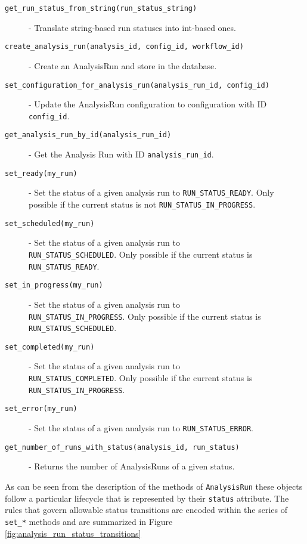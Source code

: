 \begin{description}
\item [\texttt{get_run_status_from_string(run_status_string)}] - Translate string-based run statuses into int-based ones.
\item [\texttt{create_analysis_run(analysis_id, config_id, workflow_id)}] - Create an AnalysisRun and store in the database.
\item [\texttt{set_configuration_for_analysis_run(analysis_run_id, config_id)}] - Update the AnalysisRun configuration to configuration with ID \texttt{config_id}.
\item [\texttt{get_analysis_run_by_id(analysis_run_id)}] - Get the Analysis Run with ID \texttt{analysis_run_id}.
\item [\texttt{set_ready(my_run)}] - Set the status of a given analysis run to \texttt{RUN_STATUS_READY}. Only possible if the current status is not \texttt{RUN_STATUS_IN_PROGRESS}.
\item [\texttt{set_scheduled(my_run)}] - Set the status of a given analysis run to\\ \texttt{RUN_STATUS_SCHEDULED}. Only possible if the current status is\\ \texttt{RUN_STATUS_READY}.
\item [\texttt{set_in_progress(my_run)}] - Set the status of a given analysis run to\\ \texttt{RUN_STATUS_IN_PROGRESS}. Only possible if the current status is\\ \texttt{RUN_STATUS_SCHEDULED}.
\item [\texttt{set_completed(my_run)}] - Set the status of a given analysis run to\\ \texttt{RUN_STATUS_COMPLETED}. Only possible if the current status is\\ \texttt{RUN_STATUS_IN_PROGRESS}.
\item [\texttt{set_error(my_run)}] - Set the status of a given analysis run to \texttt{RUN_STATUS_ERROR}.
\item [\texttt{get_number_of_runs_with_status(analysis_id, run_status)}] - Returns the number of AnalysisRuns of a given status.
\end{description}

As can be seen from the description of the methods of \texttt{AnalysisRun} these objects follow a particular lifecycle that is represented by their \texttt{status} attribute. The rules that govern allowable status transitions are encoded within the series of \texttt{set_*} methods and are summarized in Figure \ref{fig:analysis_run_status_transitions}

